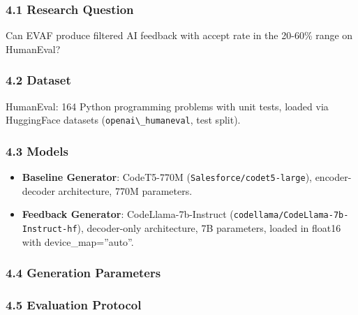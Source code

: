 
\subsubsection{4.1 Research Question}

Can EVAF produce filtered AI feedback with accept rate in the 20-60\% range on HumanEval?

\subsubsection{4.2 Dataset}

HumanEval: 164 Python programming problems with unit tests, loaded via HuggingFace datasets (\texttt{openai\textbackslash \_humaneval}, test split).

\subsubsection{4.3 Models}

\begin{itemize}
\item \textbf{Baseline Generator}: CodeT5-770M (\texttt{Salesforce/codet5-large}), encoder-decoder architecture, 770M parameters.
\item \textbf{Feedback Generator}: CodeLlama-7b-Instruct (\texttt{codellama/CodeLlama-7b-Instruct-hf}), decoder-only architecture, 7B parameters, loaded in float16 with device\_map=''auto''.
\end{itemize}

\subsubsection{4.4 Generation Parameters}

\begin{table}[htbp]
\centering
{}
\end{table}

\subsubsection{4.5 Evaluation Protocol}

